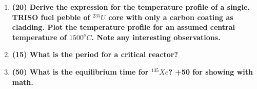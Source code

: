 \documentclass[11pt,a4paper]{article}
\begin{document}
\begin{enumerate}[leftmargin=*,topsep=0pt,font=\bfseries]
        \newpage 
    \item\textbf{(20) Derive the expression for the temperature profile of a single, TRISO fuel pebble of $^{235}U$ core with only a carbon coating as cladding. Plot the temperature profile for an assumed central temperature of $1500^o C$. Note any interesting observations.}
        \vspace{0.25in}\\























        \newpage 
    \item\textbf{(15) What is the period for a critical reactor?}
        \vspace{0.25in}\\































        \newpage 
    \item\textbf{(50) What is the equilibrium time for $^{135}Xe$? +50 for showing with math.}
        \vspace{0.25in}\\






























\end{enumerate}

\newpage


\setlength{\bibhang}{0pt}

\end{document}
